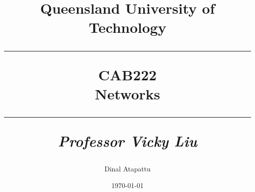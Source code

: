 \documentclass{book}
\begin{document}
    \title{
            Queensland University of Technology\\
            \rule{\linewidth}{0.5pt}
        \centering
        \textbf{CAB222} \\
        Networks\\
        \vspace{0.4cm}
        \rule{\linewidth}{1.5pt}
        \small{\textit{Professor Vicky Liu}}
    }
    \author{Dinal Atapattu}
    \date{\today}
    \maketitle
    \thispagestyle{empty}
    \tableofcontents
\end{document}

